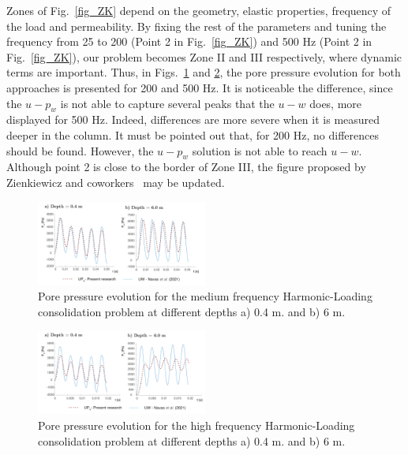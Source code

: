 \documentclass[twocolumn]{svjour3}          %
\begin{document}
Zones of Fig.~\ref{fig_ZK} depend on the geometry, elastic properties, frequency of the load and permeability.  By fixing the rest of the parameters and tuning the frequency from 25 to 200 (Point 2 in Fig.~\ref{fig_ZK}) and 500 Hz (Point 2 in Fig.~\ref{fig_ZK}), our problem becomes Zone II and III respectively, where dynamic terms are important. Thus, in Figs.~\ref{fig_con4} and \ref{fig_con5}, the pore pressure evolution for both approaches is presented for 200 and 500 Hz. It is noticeable the difference, since the $u-p_w$ is not able to capture several peaks that the $u-w$ does, more displayed for 500 Hz. Indeed, differences are more severe when it is measured deeper in the column. It must be pointed out that, for 200 Hz, no differences should be found. However, the $u-p_w$ solution is not able to reach $u-w$. Although point 2 is close to the border of Zone III, the figure proposed by Zienkiewicz and coworkers~\cite{zienkiewicz1990a} may be updated.

\begin{figure}
\begin{center}
\includegraphics[width=0.5\textwidth]{Fig/fig_MF.pdf}
\caption{Pore pressure evolution for the medium frequency Harmonic-Loading consolidation problem at different depths a) 0.4 m. and b) 6 m.}
\label{fig_con4}
\end{center}
\end{figure}

\begin{figure}
\begin{center}
\includegraphics[width=0.5\textwidth]{Fig/fig_HF.pdf}
\caption{Pore pressure evolution for the high frequency Harmonic-Loading consolidation problem at different depths a) 0.4 m. and b) 6 m.}
\label{fig_con5}
\end{center}
\end{figure}
\end{document}
